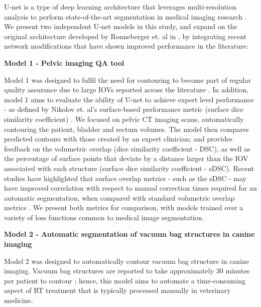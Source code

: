 U-net is a type of deep learning architecture that leverages multi-resolution analysis to perform state-of-the-art segmentation in medical imaging research \cite{Kazemifar_2018, Zhu_2018}. We present two independent U-net models in this study, and expand on the original architecture developed by Ronneberger et. al in \cite{Ronneberger_2015}, by integrating recent network modifications that have shown improved performance in the literature: 

\textbf{Model 1 - Pelvic imaging QA tool}

Model 1 was designed to fulfil the need for contouring to become part of regular quality assurance due to large IOVs reported across the literature \cite{Vinod_2016}. In addition, model 1 aims to evaluate the ability of U-net to achieve expert level performance - as defined by Nikolov et. al's surface-based performance metric (surface dice similarity coefficient) \cite{Nikolov_2018}. We focused on pelvic CT imaging scans, automatically contouring the patient, bladder and rectum volumes. The model then compares predicted contours with those created by an expert clinician; and provides feedback on the volumetric overlap (dice similarity coefficient - DSC), as well as the percentage of surface points that deviate by a distance larger than the IOV associated with each structure (surface dice similarity coefficient - sDSC). Recent studies have highlighted that surface overlap metrics - such as the sDSC - may have improved correlation with respect to manual correction times required for an automatic segmentation, when compared with standard volumetric overlap metrics \cite{Vaassen_2020}. We present both metrics for comparison, with models trained over a variety of loss functions common to medical image segmentation.

\textbf{Model 2 - Automatic segmentation of vacuum bag structures in canine imaging}

Model 2 was designed to automatically contour vacuum bag structure in canine imaging. Vacuum bag structures are reported to take approximately 30 minutes per patient to contour \cite{CITATION}; hence, this model aims to automate a time-consuming aspect of RT treatment that is typically processed manually in veterinary medicine.


